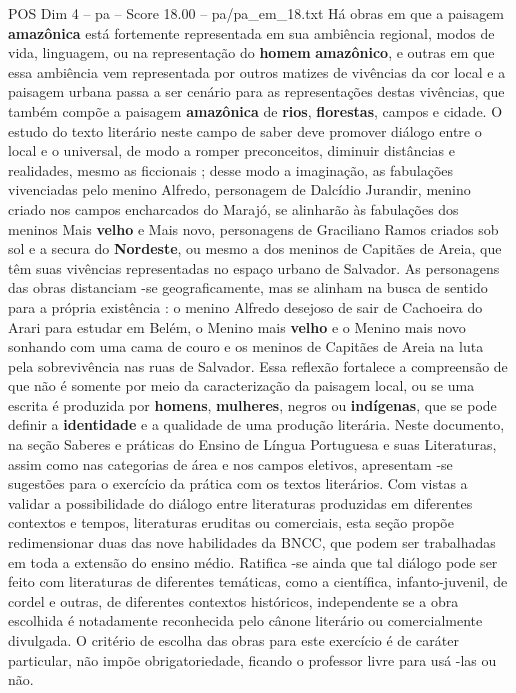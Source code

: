\begin{textsample}{POS Dim 4 – pa – Score 18.00 – pa/pa\_em\_18.txt}
Há obras em que a paisagem \textbf{amazônica} está fortemente representada em sua ambiência regional, modos de vida, linguagem, ou na representação do \textbf{homem} \textbf{amazônico}, e outras em que essa ambiência vem representada por outros matizes de vivências da cor local e a paisagem urbana passa a ser cenário para as representações destas vivências, que também compõe a paisagem \textbf{amazônica} de \textbf{rios}, \textbf{florestas}, campos e cidade.
O estudo do texto literário neste campo de saber deve promover diálogo entre o local e o universal, de modo a romper preconceitos, diminuir distâncias e realidades, mesmo as ficcionais ; desse modo a imaginação, as fabulações vivenciadas pelo menino Alfredo, personagem de Dalcídio Jurandir, menino criado nos campos encharcados do Marajó, se alinharão às fabulações dos meninos Mais \textbf{velho} e Mais novo, personagens de Graciliano Ramos criados sob sol e a secura do \textbf{Nordeste}, ou mesmo a dos meninos de Capitães de Areia, que têm suas vivências representadas no espaço urbano de Salvador.
As personagens das obras distanciam -se geograficamente, mas se alinham na busca de sentido para a própria existência : o menino Alfredo desejoso de sair de Cachoeira do Arari para estudar em Belém, o Menino mais \textbf{velho} e o Menino mais novo sonhando com uma cama de couro e os meninos de Capitães de Areia na luta pela sobrevivência nas ruas de Salvador.
Essa reflexão fortalece a compreensão de que não é somente por meio da caracterização da paisagem local, ou se uma escrita é produzida por \textbf{homens}, \textbf{mulheres}, negros ou \textbf{indígenas}, que se pode definir a \textbf{identidade} e a qualidade de uma produção literária.
Neste documento, na seção Saberes e práticas do Ensino de Língua Portuguesa e suas Literaturas, assim como nas categorias de área e nos campos eletivos, apresentam -se sugestões para o exercício da prática com os textos literários.
Com vistas a validar a possibilidade do diálogo entre literaturas produzidas em diferentes contextos e tempos, literaturas eruditas ou comerciais, esta seção propõe redimensionar duas das nove habilidades da BNCC, que podem ser trabalhadas em toda a extensão do ensino médio.
Ratifica -se ainda que tal diálogo pode ser feito com literaturas de diferentes temáticas, como a científica, infanto-juvenil, de cordel e outras, de diferentes contextos históricos, independente se a obra escolhida é notadamente reconhecida pelo cânone literário ou comercialmente divulgada.
O critério de escolha das obras para este exercício é de caráter particular, não impõe obrigatoriedade, ficando o professor livre para usá -las ou não.

\end{textsample}
